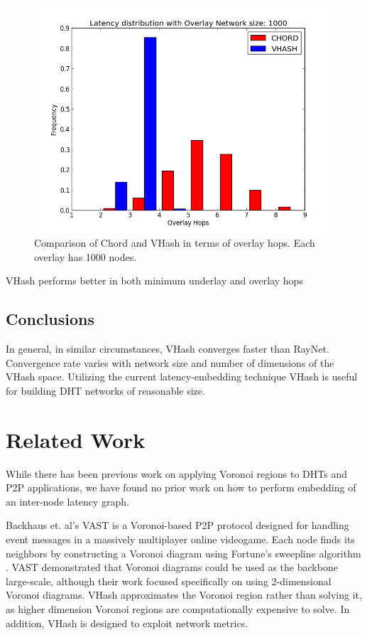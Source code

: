 \documentclass{IEEEtran}
\begin{document}
\begin{figure}
	\centering
	\includegraphics[width=\linewidth]{hist_overlay_4d}
	\caption{Comparison of Chord and VHash in terms of overlay hops.  Each overlay has 1000 nodes.}
	\label{hist1000}
\end{figure}


VHash performs better in both minimum underlay and overlay hops


\subsection{Conclusions}
In general, in similar circumstances, VHash converges faster than RayNet.
Convergence rate varies with network size and number of dimensions of the VHash space.
Utilizing the current latency-embedding technique VHash is useful for building DHT networks of reasonable size.

\section{Related Work}
While there has been previous work on applying Voronoi regions to DHTs and P2P applications, we have found no prior work on how to perform embedding of an inter-node latency graph.   

Backhaus et. al's  VAST \cite{Backhaus:2007:VAS:1326257.1326266} is a Voronoi-based P2P protocol designed for handling event messages in a massively multiplayer online videogame.  
Each node finds its neighbors by constructing a Voronoi diagram using Fortune's sweepline algorithm \cite{fortune1987sweepline}.  
VAST demonstrated that Voronoi diagrams could be used as the backbone  large-scale, although their work focused specifically on using 2-dimensional Voronoi diagrams.  
VHash approximates the Voronoi region rather than solving it, as higher dimension Voronoi regions are computationally expensive to solve.
In addition, VHash is designed to exploit network metrics.
\end{document}
